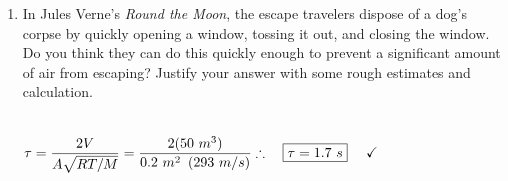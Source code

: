 \documentclass[fleqn]{article}
\begin{document}
\begin{enumerate}
\begin{enumerate}
        \item In Jules Verne's \emph{Round the Moon}, the escape travelers dispose of a dog's corpse by quickly opening a window,
        tossing it out, and closing the window. Do you think they can do this quickly enough to prevent a significant amount of air
        from escaping? Justify your answer with some rough estimates and calculation.

          \textcolor{hwColor}{
            \\
            $
              \tau=\dfrac{2V}{A\sqrt{RT/M}}=\dfrac{2(50 ~ m^3)}{0.2 ~ m^2 ~ \left(293 ~ m/s\right)}
              \\
              \\
              \\
              \therefore ~~~ \boxed{
                \tau=1.7 ~ s
              } ~~~~ \checkmark
            $
            \\
          }

      \end{enumerate}

  \end{enumerate}
\end{document}
